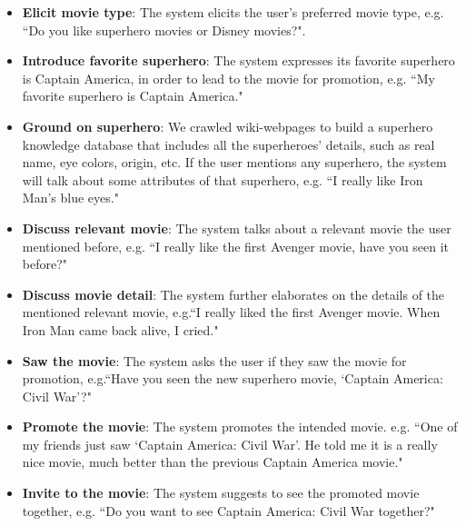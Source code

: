 \documentclass[11pt]{article}
\newcommand{\dk}[1]{{\color{red} #1}}
\begin{document}
\begin{itemize}
    
\item \textbf{Elicit movie type}: The system elicits the user's preferred movie type, e.g. ``Do you like superhero movies or Disney movies?". %

\item \textbf{Introduce favorite superhero}: The system expresses its favorite superhero is Captain America, in order to lead to the movie for promotion, e.g. ``My favorite superhero is Captain America."
 
\item \textbf{Ground on superhero}: We crawled wiki-webpages to build a superhero knowledge database that includes all the superheroes' details, such as real name, eye colors, origin, etc. If the user mentions any superhero, the system will talk about some attributes of that superhero, e.g.  ``I really like Iron Man's blue eyes." 

\item \textbf{Discuss relevant movie}: The system talks about a relevant movie the user mentioned before, e.g. ``I really like the first Avenger movie, have you seen it before?" 

\item \textbf{Discuss movie detail}: The system further elaborates on the details of the mentioned relevant movie, e.g.``I really liked the first Avenger movie. When Iron Man came back alive, I cried." 

\item \textbf{Saw the movie}: The system asks the user if they saw the movie for promotion, e.g.``Have you seen the new superhero movie, `Captain America: Civil War'?" 

\item \textbf{Promote the movie}: The system promotes the intended movie. e.g. ``One of my friends just saw `Captain America: Civil War'. He told me it is a really nice movie, much better than the previous Captain America movie."

\item \textbf{Invite to the movie}: The system suggests to see the promoted movie together, e.g. ``Do you want to see Captain America: Civil War together?" %


\end{itemize}
\end{document}
